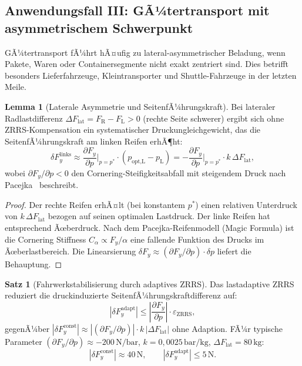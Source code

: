 ﻿\documentclass[a4paper,12pt]{article}
\theoremstyle{definition}
\newtheorem{satz}{Satz}
\newtheorem{lemma}{Lemma}
\begin{document}
\subsection{Anwendungsfall III: GÃ¼tertransport mit asymmetrischem Schwerpunkt}

GÃ¼tertransport fÃ¼hrt hÃ¤ufig zu lateral-asymmetrischer Beladung, wenn Pakete,
Waren oder Containersegmente nicht exakt zentriert sind. Dies betrifft besonders
Lieferfahrzeuge, Kleintransporter und Shuttle-Fahrzeuge in der letzten Meile.

\begin{lemma}[Laterale Asymmetrie und SeitenfÃ¼hrungskraft]
\label{lem:lateral}
Bei lateraler Radlastdifferenz $\Delta F_{\text{lat}} = F_{\text{R}} - F_{\text{L}} > 0$
(rechte Seite schwerer) ergibt sich ohne ZRRS-Kompensation ein systematischer
Druckungleichgewicht, das die SeitenfÃ¼hrungskraft am linken Reifen erhÃ¶ht:
\[
    \delta F_y^{\text{links}} \approx
    \frac{\partial F_y}{\partial p}\bigg|_{p=p^*} \cdot (p_{\text{opt,L}} - p_{\text{L}})
    = -\frac{\partial F_y}{\partial p}\bigg|_{p=p^*} \cdot k\,\Delta F_{\text{lat}},
\]
wobei $\partial F_y / \partial p < 0$ den Cornering-Steifigkeitsabfall mit
steigendem Druck nach Pacejka~\cite{pacejka} beschreibt.
\end{lemma}

\begin{proof}
Der rechte Reifen erhÃ¤lt (bei konstantem $p^*$) einen relativen Unterdruck
von $k\,\Delta F_{\text{lat}}$ bezogen auf seinen optimalen Lastdruck. Der
linke Reifen hat entsprechend Ãœberdruck. Nach dem Pacejka-Reifenmodell
(Magic Formula) ist die Cornering Stiffness $C_\alpha \propto F_y / \alpha$
eine fallende Funktion des Drucks im Ãœberlastbereich. Die Linearsierung
$\delta F_y \approx (\partial F_y / \partial p) \cdot \delta p$ liefert die
Behauptung.
\end{proof}

\begin{satz}[Fahrwerkstabilisierung durch adaptives ZRRS]
\label{satz:stabfahrwerk}
Das lastadaptive ZRRS reduziert die druckinduzierte SeitenfÃ¼hrungskraftdifferenz
auf:
\[
    |\delta F_y^{\text{adapt}}| \leq \left|\frac{\partial F_y}{\partial p}\right|
    \cdot \varepsilon_{\text{ZRRS}},
\]
gegenÃ¼ber $|\delta F_y^{\text{const}}| \approx |(\partial F_y / \partial p)| \cdot k\,|\Delta F_{\text{lat}}|$
ohne Adaption. FÃ¼r typische Parameter
$(\partial F_y / \partial p) \approx -200\,\text{N/bar}$,
$k = 0{,}0025\,\text{bar/kg}$, $\Delta F_{\text{lat}} = 80\,\text{kg}$:
\[
    |\delta F_y^{\text{const}}| \approx 40\,\text{N},
    \qquad
    |\delta F_y^{\text{adapt}}| \leq 5\,\text{N}.
\]
\end{satz}
\end{document}

